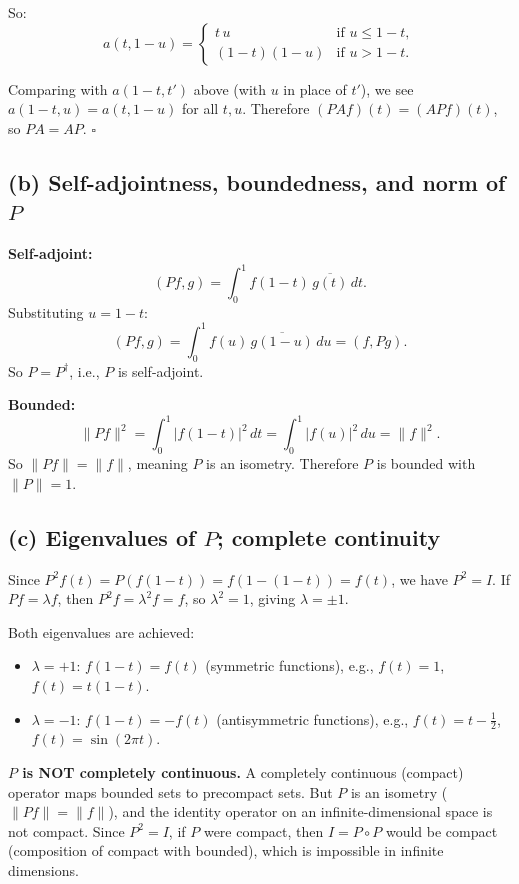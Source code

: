 \documentclass[12pt]{article}
\begin{document}
So:
\[
a(t, 1-u) = \begin{cases} t\,u & \text{if } u \le 1-t, \\ (1-t)(1-u) & \text{if } u > 1-t. \end{cases}
\]

Comparing with $a(1-t, t')$ above (with $u$ in place of $t'$), we see $a(1-t, u) = a(t, 1-u)$ for all $t, u$. Therefore $(PAf)(t) = (APf)(t)$, so $PA = AP$. \hfill $\square$

\subsection*{(b) Self-adjointness, boundedness, and norm of $P$}

\textbf{Self-adjoint:}
\[
(Pf, g) = \int_0^1 f(1-t)\,\overline{g(t)}\,dt.
\]
Substituting $u = 1-t$:
\[
(Pf, g) = \int_0^1 f(u)\,\overline{g(1-u)}\,du = (f, Pg).
\]
So $P = P^\dagger$, i.e., $P$ is self-adjoint.

\textbf{Bounded:}
\[
\|Pf\|^2 = \int_0^1 |f(1-t)|^2\,dt = \int_0^1 |f(u)|^2\,du = \|f\|^2.
\]
So $\|Pf\| = \|f\|$, meaning $P$ is an isometry. Therefore $P$ is bounded with $\boxed{\|P\| = 1}$.

\subsection*{(c) Eigenvalues of $P$; complete continuity}

Since $P^2 f(t) = P(f(1-t)) = f(1-(1-t)) = f(t)$, we have $P^2 = I$. If $Pf = \lambda f$, then $P^2 f = \lambda^2 f = f$, so $\lambda^2 = 1$, giving $\lambda = \pm 1$.

Both eigenvalues are achieved:
\begin{itemize}
\item $\lambda = +1$: $f(1-t) = f(t)$ (symmetric functions), e.g., $f(t) = 1$, $f(t) = t(1-t)$.
\item $\lambda = -1$: $f(1-t) = -f(t)$ (antisymmetric functions), e.g., $f(t) = t - \tfrac{1}{2}$, $f(t) = \sin(2\pi t)$.
\end{itemize}

\textbf{$P$ is NOT completely continuous.} A completely continuous (compact) operator maps bounded sets to precompact sets. But $P$ is an isometry ($\|Pf\| = \|f\|$), and the identity operator on an infinite-dimensional space is not compact. Since $P^2 = I$, if $P$ were compact, then $I = P \circ P$ would be compact (composition of compact with bounded), which is impossible in infinite dimensions.
\end{document}
